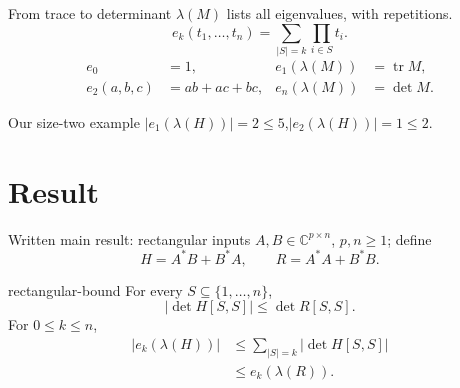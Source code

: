 \documentclass{beamer}
\begin{document}
\begin{frame}{From trace to determinant}
$\lambda(M)$ lists all eigenvalues, with repetitions.
\[
e_k(t_1,\ldots,t_n)=\sum_{|S|=k}\prod_{i\in S}t_i.
\]
\begin{align*}
e_0&=1, &e_1(\lambda(M))&=\operatorname{tr}M,\\
e_2(a,b,c)&=ab+ac+bc, &e_n(\lambda(M))&=\det M.
\end{align*}
\begin{block}{Our size-two example}
$|e_1(\lambda(H))|=2\leq5$,\quad $|e_2(\lambda(H))|=1\leq2$.
\end{block}
\end{frame}
\section{Result}
\begin{frame}{Written main result: rectangular inputs}
$A,B\in\mathbb C^{p\times n}$, $p,n\geq1$; define
\[
H=A^*B+B^*A,\qquad R=A^*A+B^*B.
\]
\begin{bookresult}{rectangular-bound}
For every $S\subseteq\{1,\ldots,n\}$,
\[
|\det H[S,S]|\leq\det R[S,S].
\]
For $0\leq k\leq n$,
\begin{align*}
|e_k(\lambda(H))|&\leq\sum_{|S|=k}|\det H[S,S]|\\
&\leq e_k(\lambda(R)).
\end{align*}
\end{bookresult}
\end{frame}
\end{document}
